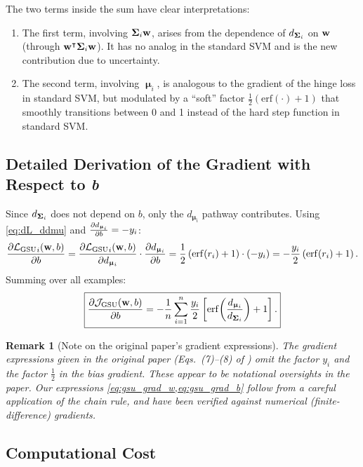 \documentclass[11pt, letterpaper]{article}
\newcommand{\bSigma}{\vb{\Sigma}}
\newcommand{\bmu}{\boldsymbol{\upmu}}
\newcommand{\loss}{\mathcal{L}}
\newcommand{\obj}{\mathcal{J}}
\newtheorem{remark}{Remark}[section]
\begin{document}
The two terms inside the sum have clear interpretations:
\begin{enumerate}[leftmargin=2em]
    \item The first term, involving $\bSigma_i \vb{w}$, arises from the dependence of $d_{\bSigma_i}$ on $\vb{w}$ (through $\vb{w}^{\intercal} \bSigma_i \vb{w}$). It has no analog in the standard SVM and is the new contribution due to uncertainty.
    \item The second term, involving $\bmu_i$, is analogous to the gradient of the hinge loss in standard SVM, but modulated by a ``soft'' factor $\frac{1}{2}(\mathrm{erf}(\cdot) + 1)$ that smoothly transitions between 0 and 1 instead of the hard step function in standard SVM.
\end{enumerate}

\subsection{Detailed Derivation of the Gradient with Respect to \textit{b}}

Since $d_{\bSigma_i}$ does not depend on $b$, only the $d_{\bmu_i}$ pathway contributes. Using \cref{eq:dL_ddmu} and $\pdv{d_{\bmu_i}}{b} = -y_i$:
\begin{equation}
    \pdv{{\loss_{\text{GSU}}}_{i}(\vb{w}, b)}{b} = \pdv{{\loss_{\text{GSU}}}_{i}(\vb{w}, b)}{d_{\bmu_i}} \cdot \pdv{d_{\bmu_i}}{b} = \frac{1}{2}\left(\mathrm{erf}(r_i)+1\right) \cdot (-y_i) = -\frac{y_i}{2}\left(\mathrm{erf}(r_i)+1\right).
\end{equation}
Summing over all examples:
\begin{equation}\label{eq:gsu_grad_b}
    \boxed{\pdv{\obj_{\text{GSU}} (\vb{w}, b)}{b} = -\frac{1}{n}\sum_{i=1}^{n} \frac{y_i}{2} \left[\mathrm{erf}\!\left(\frac{d_{\bmu_i}}{d_{\bSigma_i}}\right) + 1\right].}
\end{equation}

\begin{remark}[Note on the original paper's gradient expressions]
The gradient expressions given in the original paper (Eqs.~(7)--(8) of \textcite{tzelepis2017linear}) omit the factor $y_i$ and the factor $\tfrac{1}{2}$ in the bias gradient. These appear to be notational oversights in the paper. Our expressions \cref{eq:gsu_grad_w,eq:gsu_grad_b} follow from a careful application of the chain rule, and have been verified against numerical (finite-difference) gradients.
\end{remark}

\subsection{Computational Cost}
\end{document}
